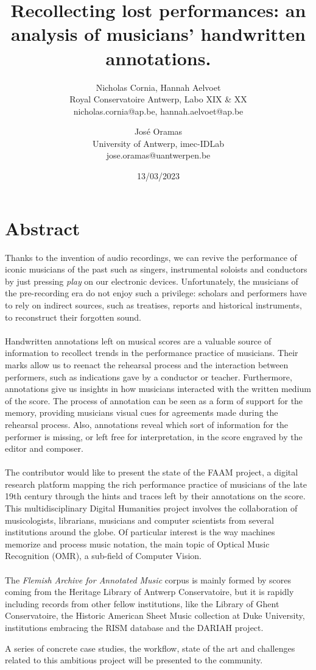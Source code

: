 \documentclass[10pt,a4paper]{article}
\title{ Recollecting lost performances: an analysis of musicians' handwritten annotations.}
\author{
Nicholas Cornia, Hannah Aelvoet \\ Royal Conservatoire Antwerp, Labo XIX \& XX \\ nicholas.cornia@ap.be, hannah.aelvoet@ap.be
 \and 
 Jos\'{e} Oramas \\ University of Antwerp, imec-IDLab \\ jose.oramas@uantwerpen.be  }
\date{13/03/2023}
\begin{document}
\maketitle


\section*{Abstract}

Thanks to the invention of audio recordings, we can revive the performance of iconic musicians of the past such as singers, instrumental soloists and conductors by just pressing \emph{play} on our electronic devices. Unfortunately, the musicians of the pre-recording era do not enjoy such a privilege: scholars and performers have to rely on indirect sources, such as treatises, reports and historical instruments, to reconstruct their forgotten sound.
\\ \\
Handwritten annotations left on musical scores are a valuable source of information to recollect trends in the performance practice of musicians. Their marks allow us to reenact the rehearsal process and the interaction between performers, such as indications gave by a conductor or teacher. Furthermore, annotations give us insights in how musicians interacted with the written medium of the score. The process of annotation can be seen as a form of support for the memory, providing musicians visual cues for agreements made during the rehearsal process. Also, annotations reveal which sort of information for the performer is missing, or left free for interpretation, in the score engraved by the editor and composer.
\\ \\
The contributor would like to present the state of the FAAM project, a digital research platform mapping the rich performance practice of musicians of the late 19th century through the hints and traces left by their annotations on the score. This multidisciplinary Digital Humanities project involves the collaboration of musicologists, librarians, musicians and computer scientists from several institutions around the globe. Of particular interest is the way machines memorize and process music notation, the main topic of Optical Music Recognition (OMR), a sub-field of Computer Vision.
\\ \\
The \emph{Flemish Archive for Annotated Music} corpus is mainly formed by scores coming from the Heritage Library of Antwerp Conservatoire, but it is rapidly including records from other fellow institutions, like the Library of Ghent Conservatoire, the Historic American Sheet Music collection at Duke University, institutions embracing the RISM database and the DARIAH project.

A series of concrete case studies, the workflow, state of the art and challenges related to this ambitious project will be presented to the community. 



\newpage

\printbibliography [title = {References}]
\end{document}
